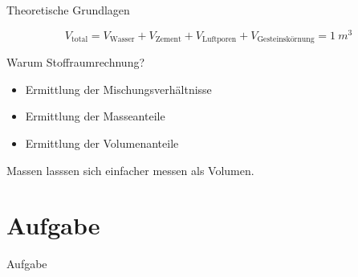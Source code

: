 \begin{frame}{Theoretische Grundlagen}

    \begin{equation*}
        V_\text{total} = V_{\text{Wasser}} + V_{\text{Zement}} + V_{\text{Luftporen}} + V_{\text{Gesteinskörnung}} = \SI{1}{m^3}
    \end{equation*}

\end{frame}

\begin{frame}{Warum Stoffraumrechnung?}
    \begin{itemize}
        \item Ermittlung der Mischungsverhältnisse
        \item Ermittlung der Masseanteile
        \item Ermittlung der Volumenanteile
    \end{itemize}
    \pause
    \vspace{1cm}
    Massen lasssen sich einfacher messen als Volumen.

\end{frame}







\section{Aufgabe}
\BlueSectionSlide

\begin{frame}{Aufgabe}
    \begin{table}[h]
        \centering
        \caption{Aufgabe zur Stoffraumberechnung}
        \small
        \label{tab:Stoffraumberechnung}
        \end{table}

\end{frame}

